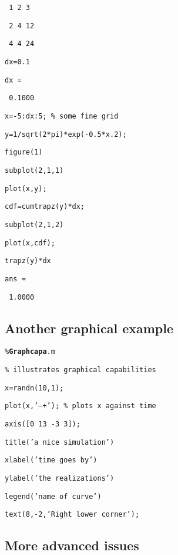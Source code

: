 \documentclass[12pt,a4paper]{article}
\begin{document}
\texttt{\ 1 2 3}

\texttt{\ 2 4 12}

\texttt{\ 4 4 24}

\texttt{dx=0.1}

\texttt{dx =}

\texttt{\ 0.1000}

\texttt{x=-5:dx:5; \% some fine grid}

\texttt{y=1/sqrt(2*pi)*exp(-0.5*x.2);}

\texttt{figure(1)}

\texttt{subplot(2,1,1)}

\texttt{plot(x,y);}

\texttt{cdf=cumtrapz(y)*dx;}

\texttt{subplot(2,1,2)}

\texttt{plot(x,cdf);}

\texttt{trapz(y)*dx}

\texttt{ans =}

\texttt{\ 1.0000}


\subsection{Another graphical example}

\texttt{\%\textbf{Graphcapa}.m}

\texttt{\% illustrates graphical capabilities}

\texttt{x=randn(10,1);}

\texttt{plot(x,'--+'); \% plots x against time}

\texttt{axis([0 13 -3 3]);}

\texttt{title('a nice simulation')}

\texttt{xlabel('time goes by')}

\texttt{ylabel('the realizations')}

\texttt{legend('name of curve')}

\texttt{text(8,-2,'Right lower corner');}

\subsection{\protect\bigskip More advanced issues}
\end{document}
